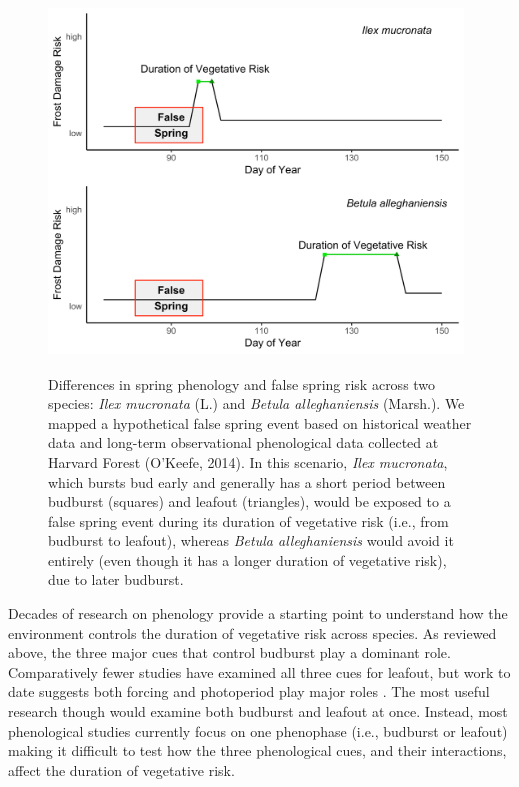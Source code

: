 \documentclass{article}\usepackage[]{graphicx}\usepackage[]{color}
\begin{document}
\begin{figure} [H] 
 \begin{center}
 \includegraphics[width=11cm, height=10cm]{..//figures/dvrgraphic_color.pdf} 
 \caption{Differences in spring phenology and false spring risk across two species: \textit{Ilex mucronata} (L.) and \textit{Betula alleghaniensis} (Marsh.). We mapped a hypothetical false spring event based on historical weather data and long-term observational phenological data collected at Harvard Forest (O'Keefe, 2014). In this scenario, \textit{Ilex mucronata}, which bursts bud early and generally has a short period between budburst (squares) and leafout (triangles), would be exposed to a false spring event during its duration of vegetative risk (i.e., from budburst to leafout), whereas \textit{Betula alleghaniensis} would avoid it entirely (even though it has a longer duration of vegetative risk), due to later budburst.}\label{fig:risk} 
 \end{center}
 \end{figure}

Decades of research on phenology provide a starting point to understand how the environment controls the duration of vegetative risk across species. As reviewed above, the three major cues that control budburst \citep[e.g., low winter temperatures, warm spring temperatures, and increasing photoperiods,][]
{Chuine2010} play a dominant role. Comparatively fewer studies have examined all three cues for leafout, but work to date suggests both forcing and photoperiod play major roles \citep{Basler2014, Flynn2018}. The most useful research though would examine both budburst and leafout at once. Instead, most phenological studies currently focus on one phenophase (i.e., budburst or leafout) making it difficult to test how the three phenological cues, and their interactions, affect the duration of vegetative risk.  
\end{document}
